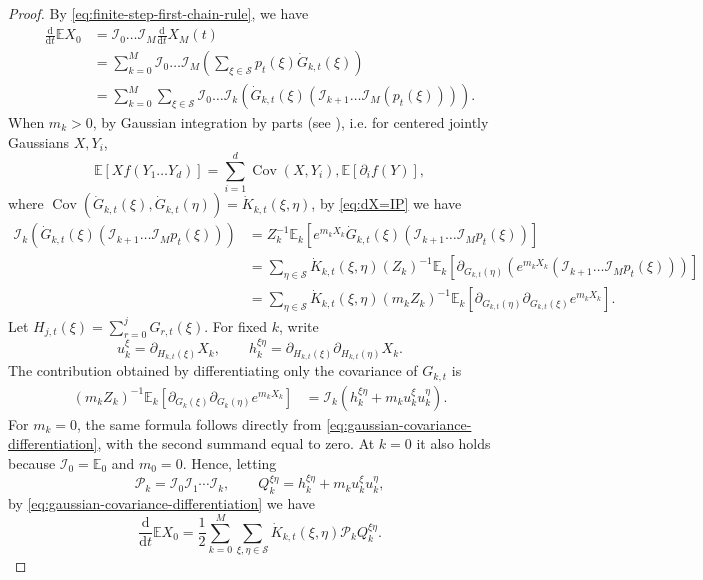 \documentclass[11pt]{article}
\numberwithin{equation}{section}
\newcommand{\E}{\mathbb{E}}
\newcommand{\1}{\mathbf 1}
\begin{document}
\begin{proof}
By \eqref{eq:finite-step-first-chain-rule}, we have
\begin{equation}
\begin{aligned}
    \frac{\mathrm d}{\mathrm dt}\E X_0 
&=\mathcal{I}_0\dots \mathcal{I}_{M}\frac{\mathrm d}{\mathrm dt} X_{M}(t)\\
&=\sum_{k=0}^M\mathcal{I}_0\dots \mathcal{I}_{M}\left( \sum_{\xi\in \mathcal{S}} p_t(\xi) \dot{G}_{k,t}(\xi)\right)\\
&= \sum_{k=0}^M \sum_{\xi\in \mathcal{S}} \mathcal{I}_0\dots\mathcal{I}_k\left(\dot{G}_{k,t}(\xi) (\mathcal{I}_{k+1} \dots\mathcal{I}_{M} (p_t(\xi)) )\right).
\label{eq:gaussian-covariance-differentiation}
\end{aligned}
\end{equation}
When $m_k>0$, by Gaussian integration by parts (see \cite[Vol. 1, Sec. A.4]{Talagrand}), i.e. for centered jointly  Gaussians $X,Y_i$,  
$$\mathbb E[Xf(Y_1\dots Y_d)] = 
\sum_{i=1}^d \operatorname{Cov}(X,Y_i),\mathbb E[\partial_i f(Y)],$$ 
where $\operatorname{Cov}(\dot{G}_{k,t}(\xi),\dot{G}_{k,t}(\eta)) = \dot K_{k,t}(\xi,\eta) $, by \eqref{eq:dX=IP} we have
\begin{align*}
 \mathcal{I}_k\left(\dot{G}_{k,t}(\xi) (\mathcal{I}_{k+1} \dots\mathcal{I}_{M} p_t(\xi) )\right)& = Z_k^{-1}  \mathbb E_k\left[e^{m_k X_k} \dot{G}_{k,t}(\xi) (\mathcal{I}_{k+1} \dots\mathcal{I}_{M} p_t(\xi) )\right] \\
 & = \sum_{\eta\in \mathcal{S}} \dot K_{k,t}(\xi,\eta) (Z_k)^{-1}\mathbb E_k\left[\partial_{{G}_{k,t}(\eta)}  ({e^{m_k X_k}} (\mathcal{I}_{k+1} \dots\mathcal{I}_{M} p_t(\xi) )) \right]\\
 &=\sum_{\eta\in \mathcal{S}} \dot K_{k,t}(\xi,\eta) (m_k Z_k)^{-1}\mathbb E_k\left[\partial_{{G}_{k,t}(\eta)} \partial_{{G}_{k,t}(\xi)} {e^{m_k X_k}}\right] .
\end{align*}
Let $H_{j,t}(\xi)=\sum^j_{r=0} G_{r,t}(\xi)$.   For fixed $k$, write
\[
u_{k}^\xi=\partial_{H_{k,t}(\xi)}X_k,
\qquad
h_{k}^{\xi\eta}
=\partial_{H_{k,t}(\xi)}\partial_{H_{k,t}(\eta)}X_k.
\]
The contribution obtained by differentiating only the
covariance of $G_{k,t}$ is
\begin{align*}
(m_k Z_k)^{-1}\E_k\!\left[
\partial_{G_k(\xi)}\partial_{G_k(\eta)}e^{m_kX_k}
\right]
&= 
\mathcal I_k\left(
h_k^{\xi\eta}+m_ku_k^\xi u_k^\eta
\right).
\end{align*}
For $m_k=0$, the same formula follows directly from
\eqref{eq:gaussian-covariance-differentiation}, with the second summand
equal to zero.  At $k=0$ it also holds because
$\mathcal I_0=\E_0$ and $m_0=0$. 
Hence, letting
\[
\mathcal P_k=\mathcal I_0\mathcal I_1\cdots\mathcal I_k,
\qquad
Q_k^{\xi\eta}=h_k^{\xi\eta}+m_ku_k^\xi u_k^\eta,
\]
by \eqref{eq:gaussian-covariance-differentiation} we have
\begin{equation}
\frac{\mathrm d}{\mathrm dt}\E X_0
=\frac12\sum_{k=0}^M\sum_{\xi,\eta\in\mathcal S}
\dot K_{k,t}(\xi,\eta)\mathcal P_kQ_k^{\xi\eta}.
\label{eq:finite-step-level-contributions}
\end{equation}


\end{proof}
\end{document}

